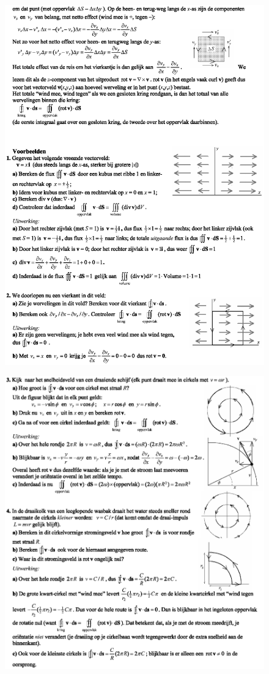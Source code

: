 \begin{figure}[ht]

\includegraphics[width=1.0\textwidth]{oefeningen.pictures/Div&Rot-1c}
\end{figure}
\newpage
\begin{figure}[ht]

\includegraphics[width=1.0\textwidth]{oefeningen.pictures/Div&Rot-1d}
\end{figure}
